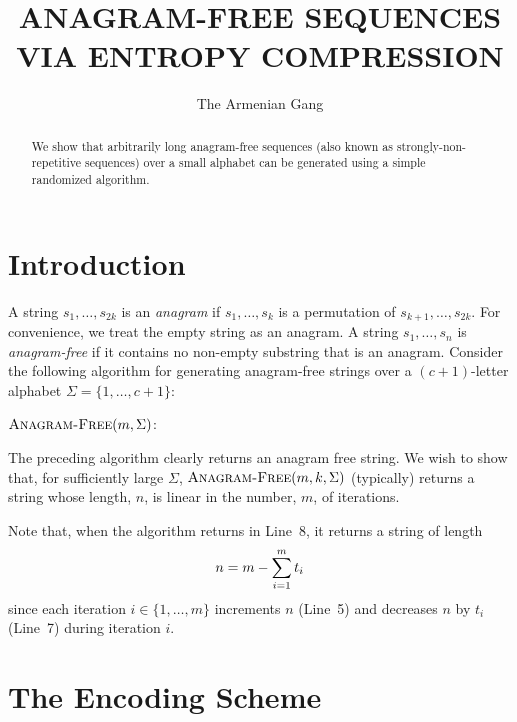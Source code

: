 \documentclass{patmorin}
\title{\MakeUppercase{Anagram-Free Sequences via Entropy Compression}}
\author{The Armenian Gang}
\begin{document}
\maketitle

\begin{abstract}
  We show that arbitrarily long anagram-free sequences (also known as strongly-non-repetitive sequences) over a small alphabet can be generated using a simple randomized algorithm.
\end{abstract}

\section{Introduction}

A string $s_1,\ldots,s_{2k}$ is an \emph{anagram} if $s_1,\ldots,s_k$ is a permutation of $s_{k+1},\ldots,s_{2k}$. For convenience, we treat the empty string as an anagram.  A string $s_1,\ldots,s_n$ is \emph{anagram-free} if it contains no non-empty substring that is an anagram.  
Consider the following algorithm for generating anagram-free strings over a $(c+1)$-letter alphabet $\Sigma=\{1,\ldots,c+1\}$:

\noindent$\textsc{Anagram-Free}(m,\Sigma)$:
\begin{algorithmic}[1]
  \ENDFOR
\end{algorithmic}

The preceding algorithm clearly returns an anagram free string.  We wish to show that, for sufficiently large $\Sigma$, $\textsc{Anagram-Free}(m, k, \Sigma)$ (typically) returns a string whose length, $n$, is linear in the number, $m$, of iterations.

Note that, when the algorithm returns in Line~8, it returns a string of length
\begin{equation}  
  n = m - \sum_{i=1}^m t_i  \eqlabel{sumsize}
\end{equation}
since each iteration $i\in\{1,\ldots,m\}$ increments $n$ (Line~5) and decreases $n$ by $t_i$ (Line~7) during iteration $i$.

\section{The Encoding Scheme}
\end{document}
